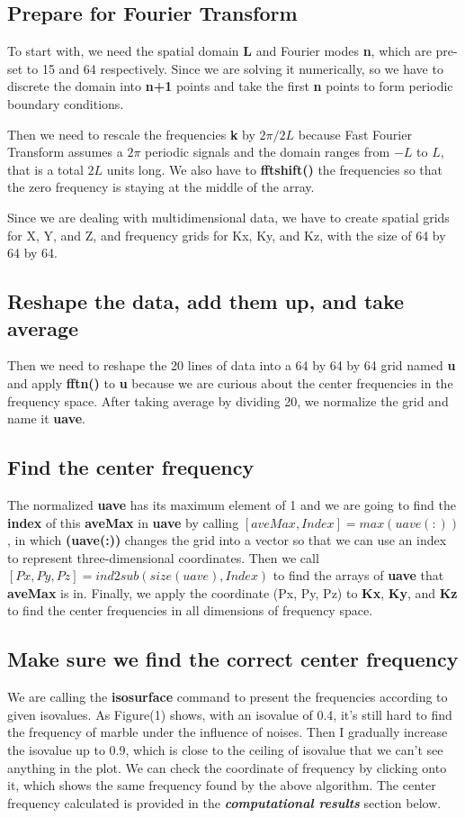 \documentclass[10pt]{article}
\begin{document}
\subsection*{Prepare for Fourier Transform}
To start with, we need the spatial domain \textbf{L} and Fourier modes \textbf{n}, which are pre-set to 15 and 64 respectively. Since we are solving it numerically, so we have to discrete the domain into \textbf{n+1} points and take the first \textbf{n} points to form periodic boundary conditions. \par
Then we need to rescale the frequencies \textbf{k} by $2{\pi}/2L$ because Fast Fourier Transform assumes a $2{\pi}$ periodic signals and the domain ranges from $-L$ to $L$, that is a total $2L$ units long. We also have to \textbf{fftshift()} the frequencies so that the zero frequency is staying at the middle of the array. \par
Since we are dealing with multidimensional data, we have to create spatial grids for X, Y, and Z, and frequency grids for Kx, Ky, and Kz, with the size of 64 by 64 by 64.
\vskip 0.5cm
\subsection*{Reshape the data, add them up, and take average}
Then we need to reshape the 20 lines of data into a 64 by 64 by 64 grid named \textbf{u} and apply \textbf{fftn()} to \textbf{u} because we are curious about the center frequencies in the frequency space. After taking average by dividing 20, we normalize the grid and name it \textbf{uave}.
\vskip 0.5cm
\subsection*{Find the center frequency}
The normalized \textbf{uave} has its maximum element of 1 and we are going to find the \textbf{index} of this \textbf{aveMax} in \textbf{uave} by calling $[aveMax, Index] = max(uave(:))$, in which \textbf{(uave(:))} changes the grid into a vector so that we can use an index to represent three-dimensional coordinates. Then we call $[Px,Py,Pz] = ind2sub(size(uave), Index)$ to find the arrays of \textbf{uave} that \textbf{aveMax} is in. Finally, we apply the coordinate (Px, Py, Pz) to \textbf{Kx}, \textbf{Ky}, and \textbf{Kz} to find the center frequencies in all dimensions of frequency space.



\subsection*{Make sure we find the correct center frequency}
We are calling the \textbf{isosurface} command to present the frequencies according to given isovalues. As Figure(1) shows, with an isovalue of 0.4, it's still hard to find the frequency of marble under the influence of noises. Then I gradually increase the isovalue up to 0.9, which is close to the ceiling of isovalue that we can't see anything in the plot. We can check the coordinate of frequency by clicking onto it, which shows the same frequency found by the above algorithm. The center frequency calculated is provided in the \textit{\textbf{computational results}} section below.
\end{document}
